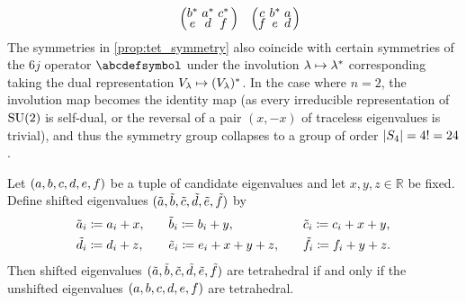 \documentclass[notitlepage, 11pt, letterpaper]{amsart}
\begin{document}
\begin{rem}
\begin{equation}
\begin{alignedat}{3}
            \quad
            &&\left(\tightsextuple{\eb^* & \ea^*  & \ec^* \\ \ee & \ed & \ef}\right)
            \quad
            &&\left(\tightsextuple{\ec & \eb^* & \ea \\ \ef & \ee & \ed}\right)\\
        \end{alignedat}
    \end{equation}
    The symmetries in \cref{prop:tet_symmetry} also coincide with certain symmetries of the $6j$ operator $\abcdefsymbol$ under the involution $\lambda \mapsto \lambda^{*}$ corresponding taking the dual representation $V_{\lambda} \mapsto (V_{\lambda})^{*}$.
    In the case where $n = 2$, the involution map becomes the identity map (as every irreducible representation of $\operatorname{SU}(2)$ is self-dual, or the reversal of a pair $(x,-x)$ of traceless eigenvalues is trivial), and thus the symmetry group collapses to a group of order $\left|S_4\right| = 4! = 24$.
\end{rem}
\begin{prop}
    \label{prop:shifting}
    Let $(a, b, c, d, e, f)$ be a tuple of candidate eigenvalues and let $x,y,z \in \mathbb R$ be fixed.
    Define shifted eigenvalues $(\tilde {a}, \tilde {b}, \tilde {c}, \tilde {d}, \tilde {e},\tilde {f})$ by
    \begin{equation}
        \label{eq:shifted_tet_eigenvalues}
        \begin{alignedat}{3}
             &\tilde {a}_i \coloneqq a_i + x, \qquad
            &&\tilde {b}_i \coloneqq b_i + y, \qquad
            &&\tilde {c}_i \coloneqq c_i + x + y, \\
             &\tilde {d}_i \coloneqq d_i + z, \qquad
            &&\tilde {e}_i \coloneqq e_i + x + y + z, \qquad
            &&\tilde {f}_i \coloneqq f_i + y + z.
        \end{alignedat}
    \end{equation}
    Then shifted eigenvalues $(\tilde {a}, \tilde {b}, \tilde {c}, \tilde {d}, \tilde {e},\tilde {f})$ are tetrahedral if and only if the unshifted eigenvalues $(a, b, c, d, e, f)$ are tetrahedral.
\end{prop}
\end{document}
